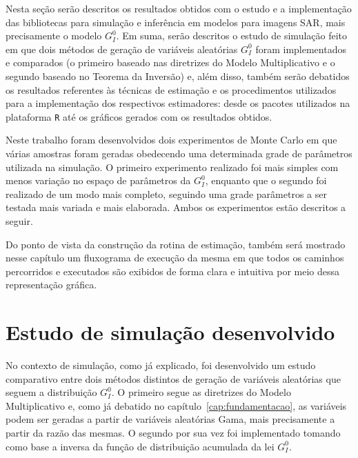 
Nesta seção serão descritos os resultados obtidos com o estudo e a implementação das bibliotecas para simulação e inferência em modelos para imagens SAR, mais precisamente o modelo $G_I^0$. Em suma, serão descritos o estudo de simulação feito em que dois métodos de geração de variáveis aleatórias $G_I^0$ foram implementados e comparados (o primeiro baseado nas diretrizes do Modelo Multiplicativo e o segundo baseado no Teorema da Inversão) e, além disso, também serão debatidos os resultados referentes às técnicas de estimação e os procedimentos utilizados para a implementação dos respectivos estimadores: desde os pacotes utilizados na plataforma \texttt{R} até os gráficos gerados com os resultados obtidos.

Neste trabalho foram desenvolvidos dois experimentos de Monte Carlo em que várias amostras foram geradas obedecendo uma determinada grade de parâmetros utilizada na simulação. O primeiro experimento realizado foi mais simples com menos variação no espaço de parâmetros da $G_I^0$, enquanto que o segundo foi realizado de um modo mais completo, seguindo uma grade parâmetros a ser testada mais variada e mais elaborada. Ambos os experimentos estão descritos a seguir.

Do ponto de vista da construção da rotina de estimação, também será mostrado nesse capítulo um fluxograma de execução da mesma em que todos os caminhos percorridos e executados são exibidos de forma clara e intuitiva por meio dessa representação gráfica.

\section{Estudo de simulação desenvolvido}

No contexto de simulação, como já explicado, foi desenvolvido um estudo comparativo entre dois métodos distintos de geração de variáveis aleatórias que seguem a distribuição $G_I^0$. O primeiro segue as diretrizes do Modelo Multiplicativo e, como já debatido no capítulo~\ref{cap:fundamentacao}, as variáveis podem ser geradas a partir de variáveis aleatórias Gama, mais precisamente a partir da razão das mesmas. O segundo por sua vez foi implementado tomando como base a inversa da função de distribuição acumulada da lei $G_I^0$.

